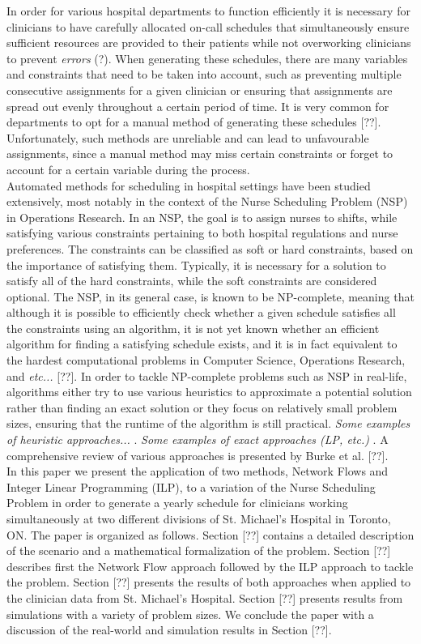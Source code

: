In order for various hospital departments to function efficiently it is necessary for clinicians to have carefully allocated on-call schedules that simultaneously ensure sufficient resources are provided to their patients while not overworking clinicians to prevent \textit{errors} (?). When generating these schedules, there are many variables and constraints that need to be taken into account, such as preventing multiple consecutive assignments for a given clinician or ensuring that assignments are spread out evenly throughout a certain period of time. It is very common for departments to opt for a manual method of generating these schedules [??]. Unfortunately, such methods are unreliable and can lead to unfavourable assignments, since a manual method may miss certain constraints or forget to account for a certain variable during the process. \\

Automated methods for scheduling in hospital settings have been studied extensively, most notably in the context of the Nurse Scheduling Problem (NSP) in Operations Research. In an NSP, the goal is to assign nurses to shifts, while satisfying various constraints pertaining to both hospital regulations and nurse preferences. The constraints can be classified as soft or hard constraints, based on the importance of satisfying them. Typically, it is necessary for a solution to satisfy all of the hard constraints, while the soft constraints are considered optional. The NSP, in its general case, is known to be NP-complete, meaning that although it is possible to efficiently check whether a given schedule satisfies all the constraints using an algorithm, it is not yet known whether an efficient algorithm for finding a satisfying schedule exists, and it is in fact equivalent to the hardest computational problems in Computer Science, Operations Research, and \textit{etc...} [??]. In order to tackle NP-complete problems such as NSP in real-life, algorithms either try to use various heuristics to approximate a potential solution rather than finding an exact solution or they focus on relatively small problem sizes, ensuring that the runtime of the algorithm is still practical. \textit{Some examples of heuristic approaches...} . \textit{Some examples of exact approaches (LP, etc.)} . A comprehensive review of various approaches is presented by Burke et al. [??]. \\

In this paper we present the application of two methods, Network Flows and Integer Linear Programming (ILP), to a variation of the Nurse Scheduling Problem in order to generate a yearly schedule for clinicians working simultaneously at two different divisions of St. Michael's Hospital in Toronto, ON. The paper is organized as follows. Section [??] contains a detailed description of the scenario and a mathematical formalization of the problem. Section [??] describes first the Network Flow approach followed by the ILP approach to tackle the problem. Section [??] presents the results of both approaches when applied to the clinician data from St. Michael's Hospital. Section [??] presents results from simulations with a variety of problem sizes. We conclude the paper with a discussion of the real-world and simulation results in Section [??].